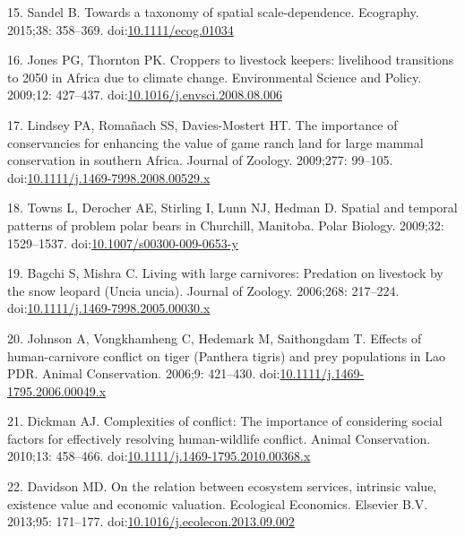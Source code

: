 \documentclass[10pt,letterpaper]{article}
\begin{document}
\hypertarget{ref-Sandel2015}{}
15. Sandel B. Towards a taxonomy of spatial scale-dependence. Ecography.
2015;38: 358--369.
doi:\href{https://doi.org/10.1111/ecog.01034}{10.1111/ecog.01034}

\hypertarget{ref-Jones2009}{}
16. Jones PG, Thornton PK. Croppers to livestock keepers: livelihood
transitions to 2050 in Africa due to climate change. Environmental
Science and Policy. 2009;12: 427--437.
doi:\href{https://doi.org/10.1016/j.envsci.2008.08.006}{10.1016/j.envsci.2008.08.006}

\hypertarget{ref-Lindsey2009}{}
17. Lindsey PA, Romañach SS, Davies-Mostert HT. The importance of
conservancies for enhancing the value of game ranch land for large
mammal conservation in southern Africa. Journal of Zoology. 2009;277:
99--105.
doi:\href{https://doi.org/10.1111/j.1469-7998.2008.00529.x}{10.1111/j.1469-7998.2008.00529.x}

\hypertarget{ref-Towns2009}{}
18. Towns L, Derocher AE, Stirling I, Lunn NJ, Hedman D. Spatial and
temporal patterns of problem polar bears in Churchill, Manitoba. Polar
Biology. 2009;32: 1529--1537.
doi:\href{https://doi.org/10.1007/s00300-009-0653-y}{10.1007/s00300-009-0653-y}

\hypertarget{ref-Bagchi2006}{}
19. Bagchi S, Mishra C. Living with large carnivores: Predation on
livestock by the snow leopard (Uncia uncia). Journal of Zoology.
2006;268: 217--224.
doi:\href{https://doi.org/10.1111/j.1469-7998.2005.00030.x}{10.1111/j.1469-7998.2005.00030.x}

\hypertarget{ref-Johnson2006}{}
20. Johnson A, Vongkhamheng C, Hedemark M, Saithongdam T. Effects of
human-carnivore conflict on tiger (Panthera tigris) and prey populations
in Lao PDR. Animal Conservation. 2006;9: 421--430.
doi:\href{https://doi.org/10.1111/j.1469-1795.2006.00049.x}{10.1111/j.1469-1795.2006.00049.x}

\hypertarget{ref-Dickman2010}{}
21. Dickman AJ. Complexities of conflict: The importance of considering
social factors for effectively resolving human-wildlife conflict. Animal
Conservation. 2010;13: 458--466.
doi:\href{https://doi.org/10.1111/j.1469-1795.2010.00368.x}{10.1111/j.1469-1795.2010.00368.x}

\hypertarget{ref-Davidson2013}{}
22. Davidson MD. On the relation between ecosystem services, intrinsic
value, existence value and economic valuation. Ecological Economics.
Elsevier B.V. 2013;95: 171--177.
doi:\href{https://doi.org/10.1016/j.ecolecon.2013.09.002}{10.1016/j.ecolecon.2013.09.002}
\end{document}
